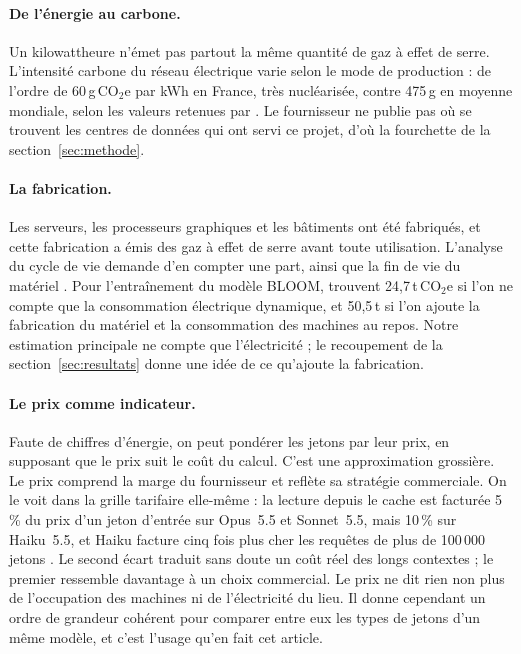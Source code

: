 \documentclass[11pt,a4paper]{article}
\begin{document}
\paragraph{De l'énergie au carbone.} Un kilowattheure n'émet pas partout la même quantité de gaz à effet de serre. L'intensité carbone du réseau électrique varie selon le mode de production : de l'ordre de 60\,g\,CO$_2$e par kWh en France, très nucléarisée, contre 475\,g en moyenne mondiale, selon les valeurs retenues par \citet{depaepe2024}. Le fournisseur ne publie pas où se trouvent les centres de données qui ont servi ce projet, d'où la fourchette de la section~\ref{sec:methode}.

\paragraph{La fabrication.} Les serveurs, les processeurs graphiques et les bâtiments ont été fabriqués, et cette fabrication a émis des gaz à effet de serre avant toute utilisation. L'analyse du cycle de vie demande d'en compter une part, ainsi que la fin de vie du matériel \citep{ligozat2022}. Pour l'entraînement du modèle BLOOM, \citet{luccioni2023} trouvent 24,7\,t\,CO$_2$e si l'on ne compte que la consommation électrique dynamique, et 50,5\,t si l'on ajoute la fabrication du matériel et la consommation des machines au repos. Notre estimation principale ne compte que l'électricité ; le recoupement de la section~\ref{sec:resultats} donne une idée de ce qu'ajoute la fabrication.

\paragraph{Le prix comme indicateur.} Faute de chiffres d'énergie, on peut pondérer les jetons par leur prix, en supposant que le prix suit le coût du calcul. C'est une approximation grossière. Le prix comprend la marge du fournisseur et reflète sa stratégie commerciale. On le voit dans la grille tarifaire elle-même : la lecture depuis le cache est facturée 5\,\% du prix d'un jeton d'entrée sur Opus~5.5 et Sonnet~5.5, mais 10\,\% sur Haiku~5.5, et Haiku facture cinq fois plus cher les requêtes de plus de 100\,000 jetons \citep{anthropicpricing}. Le second écart traduit sans doute un coût réel des longs contextes ; le premier ressemble davantage à un choix commercial. Le prix ne dit rien non plus de l'occupation des machines ni de l'électricité du lieu. Il donne cependant un ordre de grandeur cohérent pour comparer entre eux les types de jetons d'un même modèle, et c'est l'usage qu'en fait cet article.
\end{document}
